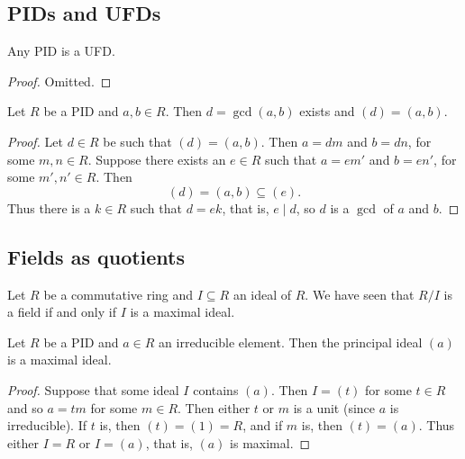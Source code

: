 \documentclass[10pt, a4paper]{article}
\begin{document}
\subsection{PIDs and UFDs}

\begin{theorem}
    Any PID is a UFD.

    \begin{proof}
        Omitted.
    \end{proof}
\end{theorem}

\begin{proposition}
    Let $R$ be a PID and $a, b \in R$.
    Then $d = \gcd(a, b)$ exists and $(d) = (a, b)$.

    \begin{proof}
        Let $d \in R$ be such that $(d) = (a, b)$.
        Then $a = dm$ and $b = dn$,
        for some $m, n \in R$.
        Suppose there exists an $e \in R$ such that $a = em'$ and $b = en'$,
        for some $m', n' \in R$.
        Then
        \[
        (d) = (a, b) \subseteq (e).
        \]
        Thus there is a $k \in R$ such that $d = ek$,
        that is,
        $e \mid d$,
        so $d$ is a $\gcd$ of $a$ and $b$.
    \end{proof}
\end{proposition}

\subsection{Fields as quotients}

Let $R$ be a commutative ring and $I \subseteq R$ an ideal of $R$.
We have seen that $R / I$ is a field if and only if $I$ is a maximal ideal.

\begin{lemma}
    Let $R$ be a PID and $a \in R$ an irreducible element.
    Then the principal ideal $(a)$ is a maximal ideal.

    \begin{proof}
        Suppose that some ideal $I$ contains $(a)$.
        Then $I = (t)$ for some $t \in R$ and so $a = tm$ for some $m \in R$.
        Then either $t$ or $m$ is a unit
        (since $a$ is irreducible).
        If $t$ is,
        then $(t) = (1) = R$,
        and if $m$ is,
        then $(t) = (a)$.
        Thus either $I = R$ or $I = (a)$,
        that is,
        $(a)$ is maximal.
    \end{proof}
\end{lemma}
\end{document}
